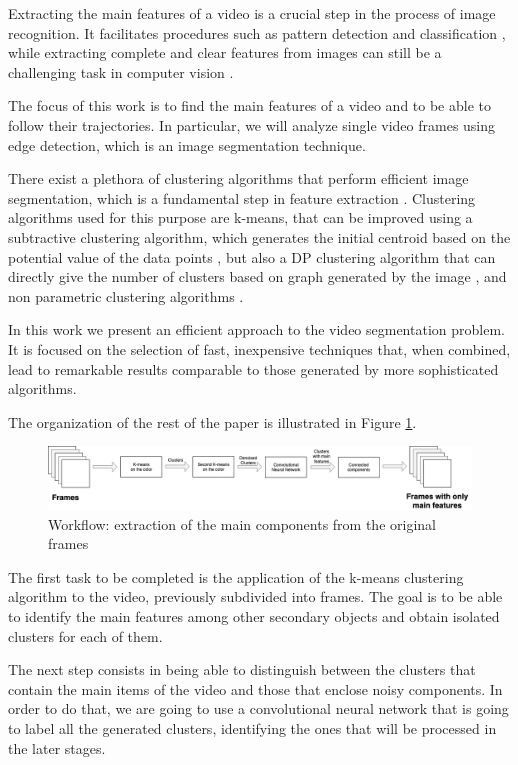 \documentclass{usiinftr}
\begin{document}
Extracting the main features of a video is a crucial step in the process of image recognition. It facilitates procedures such as pattern detection and classification \cite{4}, while extracting complete and clear features from images can still be a challenging task in computer vision \cite{5}. 

The focus of this work is to find the main features of a video and to be able to follow their trajectories. In particular, we will analyze single video frames using edge detection, which is an image segmentation technique. 

There exist a  plethora of clustering algorithms that perform efficient image segmentation, which is a fundamental step in feature extraction \cite{6}. Clustering algorithms used for this purpose are k-means, that can be improved using a subtractive clustering algorithm, which generates the initial centroid based on the potential value of the data points \cite{7}, but also a DP clustering algorithm that can directly give the number of clusters based on graph generated by the image \cite{8}, and non parametric clustering algorithms \cite{9}.

In this work we present an efficient approach to the video segmentation problem. It is focused on the selection of fast, inexpensive techniques that, when combined, lead to remarkable results comparable to those generated by more sophisticated algorithms.

The organization of the rest of the paper is illustrated in Figure \ref{fig:small}. 
 \begin{figure}[h]
	\centering
	\includegraphics[width=0.95\linewidth]{img/smallflow}
	\caption{Workflow: extraction of the main components from the original frames}
	\label{fig:small}
\end{figure}
The first task to be completed is the application of the k-means clustering algorithm to the video, previously subdivided into frames. The goal is to be able to identify the main features among other secondary objects and obtain isolated clusters for each of them.

The next step consists in being able to distinguish between the clusters that contain the main items of the video and those that enclose  noisy components. In order to do that, we are going to use a convolutional neural network that is going to label all the generated clusters, identifying the ones that will be processed in the later stages.
\end{document}
